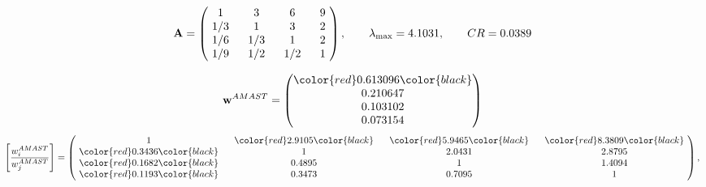 \begin{example}
\begin{equation*}
\mathbf{A} =
\begin{pmatrix}
$\,\,$ 1 $\,\,$ & $\,\,$3$\,\,$ & $\,\,$6$\,\,$ & $\,\,$9 $\,\,$ \\
$\,\,$ 1/3$\,\,$ & $\,\,$ 1 $\,\,$ & $\,\,$3$\,\,$ & $\,\,$2 $\,\,$ \\
$\,\,$ 1/6$\,\,$ & $\,\,$ 1/3$\,\,$ & $\,\,$ 1 $\,\,$ & $\,\,$2 $\,\,$ \\
$\,\,$ 1/9$\,\,$ & $\,\,$ 1/2$\,\,$ & $\,\,$ 1/2$\,\,$ & $\,\,$ 1  $\,\,$ \\
\end{pmatrix},
\qquad
\lambda_{\max} =
4.1031,
\qquad
CR = 0.0389
\end{equation*}

\begin{equation*}
\mathbf{w}^{AMAST} =
\begin{pmatrix}
\color{red} 0.613096\color{black} \\
0.210647\\
0.103102\\
0.073154
\end{pmatrix}\end{equation*}
\begin{equation*}
\left[ \frac{{w}^{AMAST}_i}{{w}^{AMAST}_j} \right] =
\begin{pmatrix}
$\,\,$ 1 $\,\,$ & $\,\,$\color{red} 2.9105\color{black} $\,\,$ & $\,\,$\color{red} 5.9465\color{black} $\,\,$ & $\,\,$\color{red} 8.3809\color{black} $\,\,$ \\
$\,\,$\color{red} 0.3436\color{black} $\,\,$ & $\,\,$ 1 $\,\,$ & $\,\,$2.0431$\,\,$ & $\,\,$2.8795  $\,\,$ \\
$\,\,$\color{red} 0.1682\color{black} $\,\,$ & $\,\,$0.4895$\,\,$ & $\,\,$ 1 $\,\,$ & $\,\,$1.4094 $\,\,$ \\
$\,\,$\color{red} 0.1193\color{black} $\,\,$ & $\,\,$0.3473$\,\,$ & $\,\,$0.7095$\,\,$ & $\,\,$ 1  $\,\,$ \\
\end{pmatrix},
\end{equation*}


\end{example}
